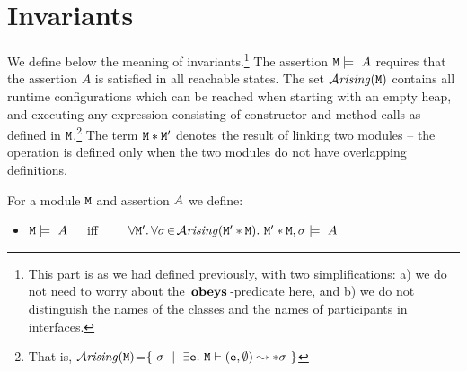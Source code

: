 \documentclass[acmsmall,screen]{acmart}
\begin{document}
  
\section{Invariants}

We define below the meaning of invariants.\footnote{This part is as we had defined previously, with two simplifications: a) we do not need to worry about the $\,\textbf{\textrm{obeys}}\,$-predicate here, and b) we do not distinguish the names of the classes and the names of participants in interfaces.}
The assertion ${\mbox{\tt{M}}}   \models\  A$ requires that  the assertion $A$ is satisfied 
in all reachable states.
The   set  ${\mathcal{A}}\textrm{\textit{rising}}({\mbox{\tt{M}}})$ contains all runtime configurations which can be reached
when starting with an empty heap,  and executing any expression consisting of constructor  and method calls
as defined in ${\mbox{\tt{M}}}$.\footnote{That is,
${\mathcal{A}}\textrm{\textit{rising}}({\mbox{\tt{M}}})$=$\{ \ \sigma\ \mid\ \exists {\mbox{\tt{e}}}.\ {\mbox{\tt{M}}} \vdash ({\mbox{\tt{e}}},\emptyset) \leadsto* \sigma \ \}$}
The term 
${\mbox{\tt{M}}}*{\mbox{\tt{M}}}'$ denotes the result of linking two modules -- the operation is defined only when the
two modules do not have overlapping definitions.


 
  

\begin{definition}[Invariants]
\label{def:invariant}
\noindent
For a module ${\mbox{\tt{M}}}$  and assertion $A$ we define:\\

 \begin{itemize}
 \item
${\mbox{\tt{M}}}   \models\  A$\ \ \  iff\ \ \ \ 
$\forall {\mbox{\tt{M}}}'.\, \forall \sigma\!\in\!{\mathcal{A}}\textrm{\textit{rising}}({\mbox{\tt{M}}}'*{\mbox{\tt{M}}}).\ {\mbox{\tt{M}}}'*{\mbox{\tt{M}}},\sigma \models \  A$
 \end{itemize}
\end{definition}
\end{document}
